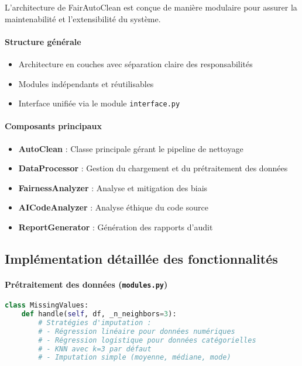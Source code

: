 L'architecture de FairAutoClean est conçue de manière modulaire pour assurer la maintenabilité et l'extensibilité du système.

\paragraph{Structure générale}
\begin{itemize}
    \item Architecture en couches avec séparation claire des responsabilités
    \item Modules indépendants et réutilisables
    \item Interface unifiée via le module \texttt{interface.py}
\end{itemize}

\paragraph{Composants principaux}
\begin{itemize}
    \item \textbf{AutoClean} : Classe principale gérant le pipeline de nettoyage
    \item \textbf{DataProcessor} : Gestion du chargement et du prétraitement des données
    \item \textbf{FairnessAnalyzer} : Analyse et mitigation des biais
    \item \textbf{AICodeAnalyzer} : Analyse éthique du code source
    \item \textbf{ReportGenerator} : Génération des rapports d'audit
\end{itemize}

\subsection{Implémentation détaillée des fonctionnalités}

\paragraph{Prétraitement des données (\texttt{modules.py})}

\begin{lstlisting}[language=Python, caption=Gestion des valeurs manquantes]
class MissingValues:
    def handle(self, df, _n_neighbors=3):
        # Stratégies d'imputation :
        # - Régression linéaire pour données numériques
        # - Régression logistique pour données catégorielles
        # - KNN avec k=3 par défaut
        # - Imputation simple (moyenne, médiane, mode)
\end{lstlisting}

